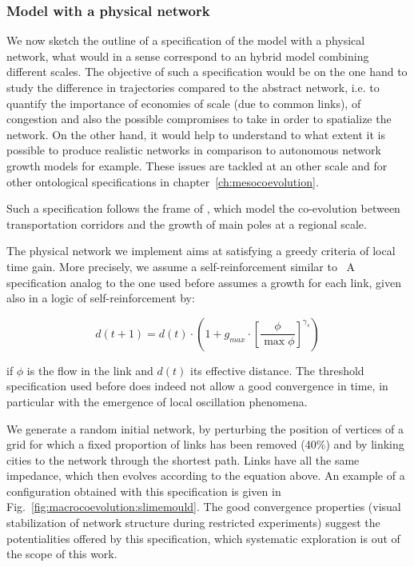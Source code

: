 \subsubsection{Model with a physical network}


We now sketch the outline of a specification of the model with a physical network, what would in a sense correspond to an hybrid model combining different scales. The objective of such a specification would be on the one hand to study the difference in trajectories compared to the abstract network, i.e. to quantify the importance of economies of scale (due to common links), of congestion and also the possible compromises to take in order to spatialize the network. On the other hand, it would help to understand to what extent it is possible to produce realistic networks in comparison to autonomous network growth models for example. These issues are tackled at an other scale and for other ontological specifications in chapter~\ref{ch:mesocoevolution}.


Such a specification follows the frame of \cite{li2014modeling}, which model the co-evolution between transportation corridors and the growth of main poles at a regional scale.


The physical network we implement aims at satisfying a greedy criteria of local time gain. More precisely, we assume a self-reinforcement similar to~\cite{tero2010rules} A specification analog to the one used before assumes a growth for each link, given also in a logic of self-reinforcement by:

\[
d(t+1) = d(t)\cdot \left(1 + g_{max} \cdot \left[\frac{\phi}{\max \phi}\right]^{\gamma_s}\right)
\]

if $\phi$ is the flow in the link and $d(t)$ its effective distance. The threshold specification used before does indeed not allow a good convergence in time, in particular with the emergence of local oscillation phenomena.

We generate a random initial network, by perturbing the position of vertices of a grid for which a fixed proportion of links has been removed (40\%) and by linking cities to the network through the shortest path. Links have all the same impedance, which then evolves according to the equation above. An example of a configuration obtained with this specification is given in Fig.~\ref{fig:macrocoevolution:slimemould}. The good convergence properties (visual stabilization of network structure during restricted experiments) suggest the potentialities offered by this specification, which systematic exploration is out of the scope of this work.


